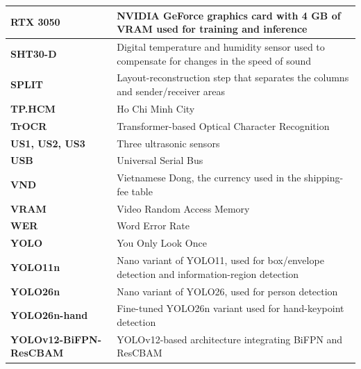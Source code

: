 \begin{longtable}{|>{\raggedright\arraybackslash}p{3.4cm}|>{\raggedright\arraybackslash}p{10.4cm}|}
\hline
\textbf{RTX 3050} & NVIDIA GeForce graphics card with 4 GB of VRAM used for training and inference \\
\hline
\textbf{\mbox{SHT30-D}} & Digital temperature and humidity sensor used to compensate for changes in the speed of sound \\
\hline
\textbf{SPLIT} & Layout-reconstruction step that separates the columns and sender/receiver areas \\
\hline
\textbf{TP.HCM} & Ho Chi Minh City \\
\hline
\textbf{TrOCR} & Transformer-based Optical Character Recognition \\
\hline
\textbf{US1, US2, US3} & Three ultrasonic sensors \\
\hline
\textbf{USB} & Universal Serial Bus \\
\hline
\textbf{VND} & Vietnamese Dong, the currency used in the shipping-fee table \\
\hline
\textbf{VRAM} & Video Random Access Memory \\
\hline
\textbf{WER} & Word Error Rate \\
\hline
\textbf{YOLO} & You Only Look Once \\
\hline
\textbf{YOLO11n} & Nano variant of YOLO11, used for box/envelope detection and information-region detection \\
\hline
\textbf{YOLO26n} & Nano variant of YOLO26, used for person detection \\
\hline
\textbf{YOLO26n-hand} & Fine-tuned YOLO26n variant used for hand-keypoint detection \\
\hline
\textbf{YOLOv12-BiFPN-ResCBAM} & YOLOv12-based architecture integrating BiFPN and ResCBAM \\
\hline

\end{longtable}
\renewcommand{\arraystretch}{1.05}
